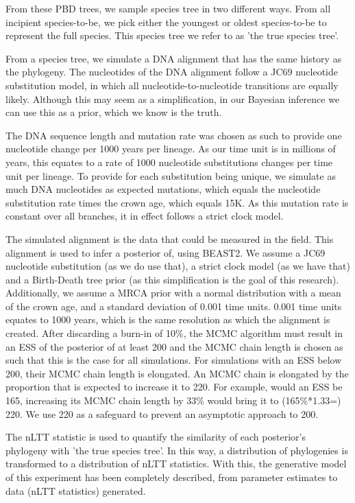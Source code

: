\documentclass{article}
\begin{document}
From these PBD trees, we sample species tree in two different ways. 
From all incipient species-to-be, we pick either the youngest or oldest
species-to-be to represent the full species. This species tree we refer
to as 'the true species tree'.

From a species tree, we simulate a DNA alignment that has the same history
as the phylogeny. The nucleotides of the DNA alignment follow a JC69
nucleotide substitution model, in which all nucleotide-to-nucleotide transitions
are equally likely. Although this may seem as a simplification, in our Bayesian
inference we can use this as a prior, which we know is the truth.

The DNA sequence length and mutation rate was chosen as such to provide one
nucleotide change per 1000 years per lineage. As our time unit is in 
millions of years, this equates to a rate of 1000 nucleotide substitutions 
changes per time unit per lineage. To provide for each substitution being unique,
we simulate as much DNA nucleotides as expected mutations, which equals the
nucleotide substitution rate times the crown age, which equals 15K. As this
mutation rate is constant over all branches, it in effect follows a strict 
clock model.

The simulated alignment is the data that could be measured in the field.
This alignment is used to infer a posterior of, using BEAST2. We assume a
JC69 nucleotide substitution (as we do use that), a strict clock model (as
we have that) and a Birth-Death tree prior (as this simplification is the goal
of this research). Additionally, we assume a MRCA prior with a normal distribution
with a mean of the crown age, and a standard deviation of 0.001 time units. 0.001
time units equates to 1000 years, which is the same resolution as which the
alignment is created. After discarding a burn-in of 10\%, the MCMC algorithm must 
result in an ESS of the posterior of at least 200 and the MCMC chain length is 
chosen as such that this is the case for all simulations. For simulations
with an ESS below 200, their MCMC chain length is elongated. An
MCMC chain is elongated by the proportion that is expected to increase it to 220. 
For example, would an ESS be 165, increasing its MCMC chain length by 33\% 
would bring it to (165\%*1.33=) 220. We use
220 as a safeguard to prevent an asymptotic approach to 200. 

The nLTT statistic is used to quantify the similarity of each posterior's phylogeny 
with 'the true species tree'. In this way, a distribution of phylogenies
is transformed to a distribution of nLTT statistics. With this, the generative
model of this experiment has been completely described, from parameter estimates
to data (nLTT statistics) generated.
\end{document}
